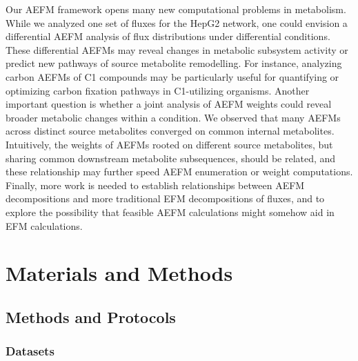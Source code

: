 \documentclass[12pt]{article}
\begin{document}
Our AEFM framework opens many new computational problems in metabolism.
While we analyzed one set of fluxes for the HepG2 network, one could
envision a differential AEFM analysis of flux distributions under
differential conditions. These differential AEFMs may reveal changes in
metabolic subsystem activity or predict new pathways of source metabolite
remodelling. For instance, analyzing carbon AEFMs of C1 compounds may be
particularly useful for quantifying or optimizing carbon fixation pathways
in C1-utilizing organisms. Another important question is whether a joint
analysis of AEFM weights could reveal broader metabolic changes within
a condition. We observed that many AEFMs across distinct source
metabolites converged on common internal metabolites. Intuitively, the
weights of AEFMs rooted on different source metabolites, but sharing
common downstream metabolite subsequences, should be related, and these
relationship may further speed AEFM enumeration or weight computations.
Finally, more work is needed to establish relationships between AEFM
decompositions and more traditional EFM decompositions of fluxes, and to
explore the possibility that feasible AEFM calculations might somehow aid
in EFM calculations.

\section*{Materials and Methods}



\subsection*{Methods and Protocols}

\subsubsection*{Datasets}
\end{document}
